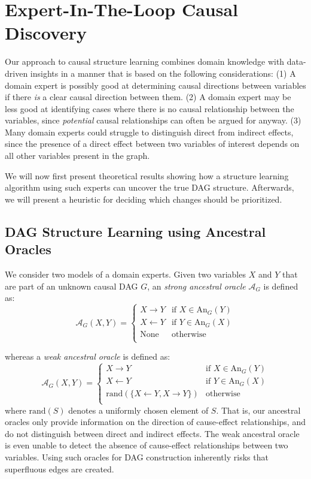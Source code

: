 \documentclass[accepted]{uai2025} %
\begin{document}
\section{Expert-In-The-Loop Causal Discovery}


Our approach to causal structure learning combines domain knowledge with data-driven
insights in a manner that is based on the following considerations: 
(1) A domain expert is possibly good at determining causal directions between variables if 
there \emph{is} a clear causal direction between them. (2) A domain expert may be less good
at identifying cases where there is no causal relationship between the variables,
since \emph{potential} causal relationships can often be argued for anyway.
(3) Many domain experts could struggle to distinguish direct from indirect 
effects, since the presence of a direct effect between two variables
of interest depends on all other variables present in the graph. 

We will now first present theoretical results showing how a structure
learning algorithm using such experts can uncover the true DAG structure.
Afterwards, we will present a heuristic for deciding which changes should
be prioritized.

\subsection{DAG Structure Learning using Ancestral Oracles}

\label{sec:modification}

We consider two models of a domain experts. Given two variables
$ X $ and $ Y $ that are part of an unknown causal DAG $G$, an \emph{strong ancestral oracle} 
$\mathcal{A}_G$ is defined as:
$$\mathcal{A}_G(X,Y)=\begin{cases}
 X \to Y & \textrm{if } X \in \textrm{An}_G(Y) \\
 X \gets Y & \textrm{if } Y \in \textrm{An}_G(X) \\
 \textrm{None} & \textrm{otherwise} \\
\end{cases}$$

whereas a \emph{weak ancestral oracle} is defined as:
$$
\mathcal{A}_G(X,Y)=\begin{cases}
 X \to Y & \textrm{if } X \in \textrm{An}_G(Y) \\
 X \gets Y & \textrm{if } Y \in \textrm{An}_G(X) \\
 \textrm{rand}(\{X \gets Y, X \to Y\}) & \textrm{otherwise} \\
\end{cases}
$$
where $\textrm{rand}(S)$ denotes a uniformly chosen element of $S$.
That is, our ancestral oracles only provide information on the direction of cause-effect
relationships, and do not distinguish between direct and indirect effects. 
The weak ancestral oracle is even unable to detect the absence of cause-effect
relationships between two variables. Using such oracles for DAG construction  
inherently risks that superfluous edges are created. 
\end{document}
